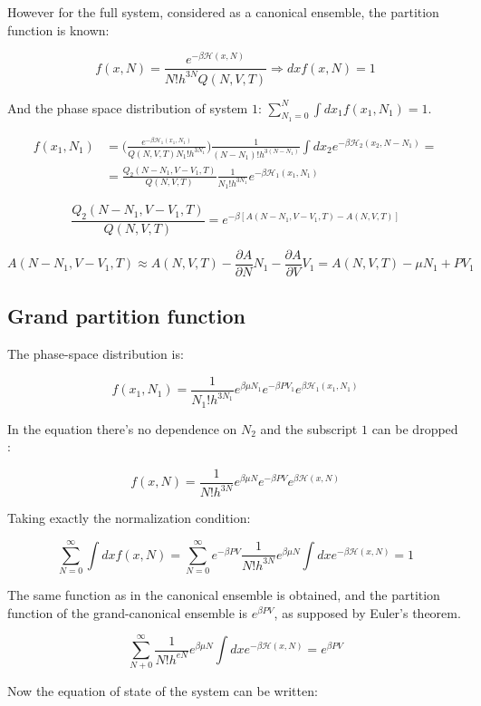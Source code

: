 However for the full system, considered as a canonical ensemble, the partition function is known:

$$f(x, N) = \frac{e^{-\beta\mathcal{H}(x, N)}}{N!h^{3N}Q(N, V, T)}\Rightarrow dxf(x, N) = 1$$

And the phase space distribution of system $1$: $\sum\limits_{N_1=0}^{N}\int dx_1f(x_1, N_1) = 1$.

\begin{align*}
	f(x_1, N_1) &=\biggl(\frac{e^{-\beta\mathcal{H}_1(x_1, N_1)}}{Q(N, V, T)N_1!h^{3N_1}}\biggr)\frac{1}{(N-N_1)!h^{3(N-N_1)}}\int dx_2e^{-\beta\mathcal{H}_2(x_2, N-N_1)} = \\
							&= \frac{Q_2(N-N_1, V-V_1, T)}{Q(N, V, T)}\frac{1}{N_1!h^{3N_1}}e^{-\beta\mathcal{H}_1(x_1, N_1)}
\end{align*}

$$\frac{Q_2(N-N_1, V-V_1, T)}{Q(N, V, T)} = e^{-\beta[A(N-N_1, V-V_1, T) - A(N, V, T)]}$$

$$A(N-N_1, V-V_1, T)\approx A(N, V, T) -\frac{\partial A}{\partial N}N_1-\frac{\partial A}{\partial V}V_1 = A(N, V, T)-\mu N_1 + PV_1$$


	\subsection{Grand partition function}

	The phase-space distribution is:

	$$f(x_1, N_1) = \frac{1}{N_1!h^{3N_1}}e^{\beta\mu N_1}e^{-\beta PV_1}e^{\beta\mathcal{H}_1(x_1, N_1)}$$

	In the equation there's no dependence on $N_2$ and the subscript $1$ can be dropped :

	$$f(x, N) = \frac{1}{N!h^{3N}}e^{\beta\mu N}e^{-\beta PV}e^{\beta\mathcal{H}(x, N)}$$

	Taking exactly the normalization condition:

	$$\sum\limits_{N=0}^{\infty}\int dxf(x, N) = \sum\limits_{N=0}^{\infty}e^{-\beta PV}\frac{1}{N!h^{3N}}e^{\beta\mu N}\int dxe^{-\beta\mathcal{H}(x, N)} = 1$$

	The same function as in the canonical ensemble is obtained, and the partition function of the grand-canonical ensemble is $e^{\beta PV}$, as supposed by Euler's theorem.

	$$\sum\limits_{N+0}^{\infty}\frac{1}{N!h^{eN }}e^{\beta\mu N}\int dxe^{-\beta\mathcal{H}(x, N)} = e^{\beta PV}$$

	Now the equation of state of the system can be written:

